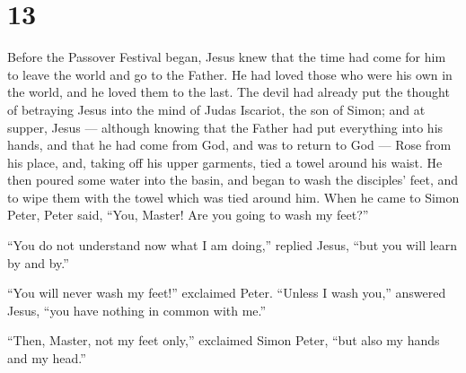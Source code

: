 \hypertarget{section-12}{%
\section{13}\label{section-12}}

 Before the Passover Festival began, Jesus knew that the
time had come for him to leave the world and go to the Father. He had
loved those who were his own in the world, and he loved them to the
last.  The devil had already put the thought of betraying
Jesus into the mind of Judas Iscariot, the son of Simon; 
and at supper, Jesus --- although knowing that the Father had put
everything into his hands, and that he had come from God, and was to
return to God ---  Rose from his place, and, taking off his
upper garments, tied a towel around his waist.  He then
poured some water into the basin, and began to wash the disciples' feet,
and to wipe them with the towel which was tied around him. 
When he came to Simon Peter, Peter said, ``You, Master! Are you going to
wash my feet?''

 ``You do not understand now what I am doing,'' replied
Jesus, ``but you will learn by and by.''

 ``You will never wash my feet!'' exclaimed Peter. ``Unless
I wash you,'' answered Jesus, ``you have nothing in common with me.''

 ``Then, Master, not my feet only,'' exclaimed Simon Peter,
``but also my hands and my head.''

